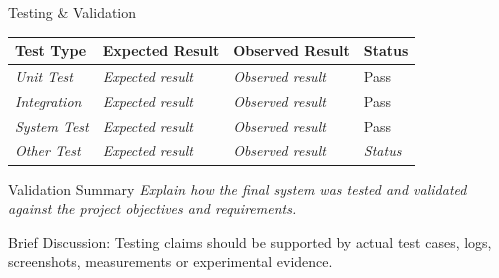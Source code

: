 \documentclass[aspectratio=169,11pt]{beamer}
\newcommand{\smallnote}[1]{%
\vspace{0.08cm}
{\scriptsize\color{GEUGrey}#1}
}
\newcommand{\placeholder}[1]{%
\textit{\color{GEUGrey}#1}
}
\begin{document}
\begin{frame}{Testing \& Validation}

\scriptsize

\begin{center}

\renewcommand{\arraystretch}{1.35}

\begin{tabularx}{.96\textwidth}
{@{}p{2.0cm}X X p{1.4cm}@{}}

\toprule
Test Type &
Expected Result &
Observed Result &
Status\\
\midrule

\placeholder{Unit Test} &
\placeholder{Expected result} &
\placeholder{Observed result} &
Pass\\

\placeholder{Integration} &
\placeholder{Expected result} &
\placeholder{Observed result} &
Pass\\

\placeholder{System Test} &
\placeholder{Expected result} &
\placeholder{Observed result} &
Pass\\

\placeholder{Other Test} &
\placeholder{Expected result} &
\placeholder{Observed result} &
\placeholder{Status}\\

\bottomrule

\end{tabularx}

\end{center}

\vspace{3mm}

\begin{block}{Validation Summary}
\placeholder{
Explain how the final system was tested and validated against
the project objectives and requirements.
}
\end{block}

\smallnote{
Brief Discussion: Testing claims should be supported by actual
test cases, logs, screenshots, measurements or experimental evidence.
}

\end{frame}
\end{document}
